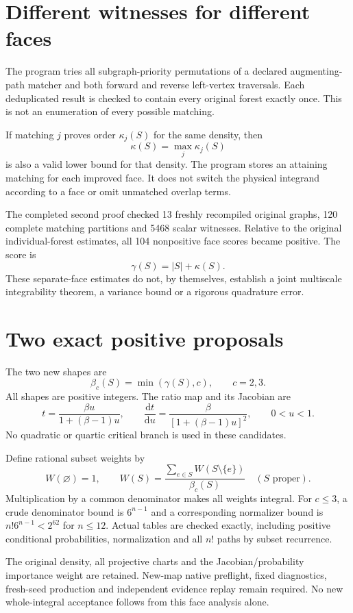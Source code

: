 \documentclass[11pt]{article}
\begin{document}
\section{Different witnesses for different faces}
The program tries all subgraph-priority permutations of a declared
augmenting-path matcher and both forward and reverse left-vertex traversals.
Each deduplicated result is checked to contain every original forest
exactly once. This is not an enumeration of every possible matching.

If matching $j$ proves order $\kappa_j(S)$ for the same density, then
\[
 \kappa(S)=\max_j\kappa_j(S)
\]
is also a valid lower bound for that density. The program stores an attaining
matching for each improved face. It does not switch the physical integrand
according to a face or omit unmatched overlap terms.

The completed second proof checked 13 freshly recompiled original graphs,
120 complete matching partitions and 5468 scalar witnesses. Relative to
the original individual-forest estimates, all 104 nonpositive face scores
became positive. The score is
\[
 \gamma(S)=|S|+\kappa(S).
\]
These separate-face estimates do not, by themselves, establish a joint
multiscale integrability theorem, a variance bound or a rigorous quadrature
error.

\section{Two exact positive proposals}
The two new shapes are
\[
 \beta_c(S)=\min(\gamma(S),c),\qquad c=2,3 .
\]
All shapes are positive integers. The ratio map and its Jacobian are
\[
 t=\frac{\beta u}{1+(\beta-1)u},\qquad
 \frac{\mathrm{d}t}{\mathrm{d}u}
 =\frac{\beta}{[1+(\beta-1)u]^2},\qquad 0<u<1.
\]
No quadratic or quartic critical branch is used in these candidates.

Define rational subset weights by
\[
 W(\varnothing)=1,\qquad
 W(S)=\frac{\sum_{e\in S}W(S\setminus\{e\})}{\beta_c(S)}
 \quad (S\text{ proper}).
\]
Multiplication by a common denominator makes all weights integral.
For $c\leq3$, a crude denominator bound is $6^{n-1}$ and a corresponding
normalizer bound is $n!6^{n-1}<2^{62}$ for $n\leq12$.
Actual tables are checked exactly, including positive conditional
probabilities, normalization and all $n!$ paths by subset recurrence.

The original density, all projective charts and the Jacobian/probability
importance weight are retained. New-map native preflight, fixed diagnostics,
fresh-seed production and independent evidence replay remain required.
No new whole-integral acceptance follows from this face analysis alone.
\end{document}
